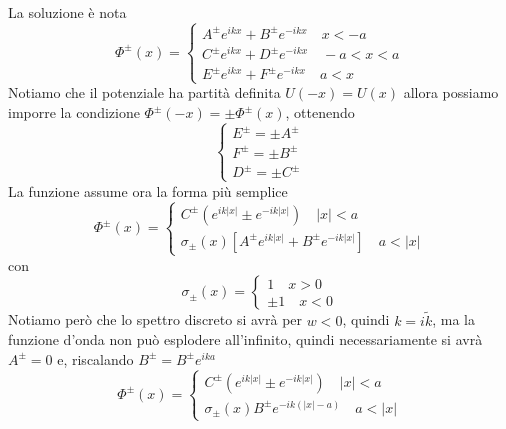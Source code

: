 \documentclass[a4paper]{article}
\begin{document}
        La soluzione è nota
        \begin{equation*}
            \Phi^\pm(x)=
            \begin{cases}
                A^\pm e^{ikx}+B^\pm e^{-ikx}\quad x<-a\\
                C^\pm e^{ikx}+D^\pm e^{-ikx}\quad -a<x<a\\
                E^\pm e^{ikx}+F^\pm e^{-ikx}\quad a<x
            \end{cases}
        \end{equation*}
        Notiamo che il potenziale ha partità definita $U(-x)=U(x)$ allora possiamo imporre la condizione $\Phi^\pm(-x)=\pm\Phi^\pm(x)$, ottenendo
        \begin{equation*}
            \begin{cases}
                E^\pm=\pm A^\pm\\
                F^\pm=\pm B^\pm\\
                D^\pm=\pm C^\pm
            \end{cases}
        \end{equation*}
        La funzione assume ora la forma più semplice
        \begin{equation*}
            \Phi^\pm(x)=
            \begin{cases}
                C^\pm \left(e^{ik\left\lvert x\right\rvert }\pm e^{-ik\left\lvert x\right\rvert }\right)\quad \left\lvert x\right\rvert<a\\
                \sigma_\pm(x)\left[A^\pm e^{ik\left\lvert x\right\rvert }+B^\pm e^{-ik\left\lvert x\right\rvert }\right]\quad a<\left\lvert x\right\rvert
            \end{cases}
        \end{equation*}
        con
        \begin{equation*}
            \sigma_\pm(x)=
            \begin{cases}
                1\quad x>0\\
                \pm 1\quad x<0
            \end{cases}
        \end{equation*}
        Notiamo però che lo spettro discreto si avrà per $w<0$, quindi $k=i\tilde{k}$, ma la funzione d'onda non può esplodere all'infinito, quindi necessariamente si avrà $A^\pm=0$ e, riscalando $B^\pm=B^\pm e^{ika}$
        \begin{equation*}
            \Phi^\pm(x)=
            \begin{cases}
                C^\pm \left(e^{ik\left\lvert x\right\rvert }\pm e^{-ik\left\lvert x\right\rvert }\right)\quad \left\lvert x\right\rvert<a\\
                \sigma_\pm(x)B^\pm e^{-ik(\left\lvert x\right\rvert-a)}\quad a<\left\lvert x\right\rvert
            \end{cases}
        \end{equation*}
\end{document}
